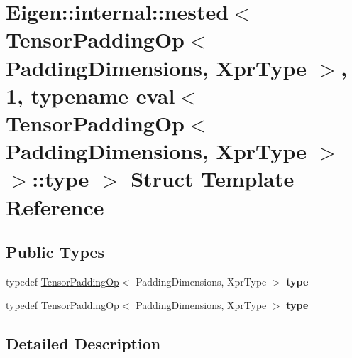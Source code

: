 \hypertarget{struct_eigen_1_1internal_1_1nested_3_01_tensor_padding_op_3_01_padding_dimensions_00_01_xpr_type5274dc122ae52b0a0b0b3a8c02d9f9cb}{}\section{Eigen\+:\+:internal\+:\+:nested$<$ Tensor\+Padding\+Op$<$ Padding\+Dimensions, Xpr\+Type $>$, 1, typename eval$<$ Tensor\+Padding\+Op$<$ Padding\+Dimensions, Xpr\+Type $>$ $>$\+:\+:type $>$ Struct Template Reference}
\label{struct_eigen_1_1internal_1_1nested_3_01_tensor_padding_op_3_01_padding_dimensions_00_01_xpr_type5274dc122ae52b0a0b0b3a8c02d9f9cb}
\subsection*{Public Types}
\begin{DoxyCompactItemize}
\item 
\mbox{\label{struct_eigen_1_1internal_1_1nested_3_01_tensor_padding_op_3_01_padding_dimensions_00_01_xpr_type5274dc122ae52b0a0b0b3a8c02d9f9cb_a61bdeac1aac3ac144927366269d09d48}} 
typedef \hyperlink{class_eigen_1_1_tensor_padding_op}{Tensor\+Padding\+Op}$<$ Padding\+Dimensions, Xpr\+Type $>$ {\bfseries type}
\item 
\mbox{\label{struct_eigen_1_1internal_1_1nested_3_01_tensor_padding_op_3_01_padding_dimensions_00_01_xpr_type5274dc122ae52b0a0b0b3a8c02d9f9cb_a61bdeac1aac3ac144927366269d09d48}} 
typedef \hyperlink{class_eigen_1_1_tensor_padding_op}{Tensor\+Padding\+Op}$<$ Padding\+Dimensions, Xpr\+Type $>$ {\bfseries type}
\end{DoxyCompactItemize}


\subsection{Detailed Description}
